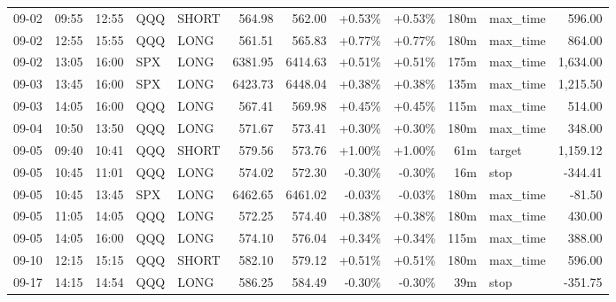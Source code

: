 \documentclass[11pt,a4paper,twoside]{article}
\begin{document}
\begin{center}
\begin{longtable}{>{\color{txtmain}}l l l l l r r r r r >{\color{txtmain}}l r}
09-02 & 09:55 & 12:55 & QQQ & SHORT & 564.98 & 562.00 & \textcolor{wingreen}{+0.53\%} & \textcolor{wingreen}{+0.53\%} & 180m & max\_time & \textcolor{wingreen}{596.00} \\
09-02 & 12:55 & 15:55 & QQQ & LONG & 561.51 & 565.83 & \textcolor{wingreen}{+0.77\%} & \textcolor{wingreen}{+0.77\%} & 180m & max\_time & \textcolor{wingreen}{864.00} \\
09-02 & 13:05 & 16:00 & SPX & LONG & 6381.95 & 6414.63 & \textcolor{wingreen}{+0.51\%} & \textcolor{wingreen}{+0.51\%} & 175m & max\_time & \textcolor{wingreen}{1,634.00} \\
09-03 & 13:45 & 16:00 & SPX & LONG & 6423.73 & 6448.04 & \textcolor{wingreen}{+0.38\%} & \textcolor{wingreen}{+0.38\%} & 135m & max\_time & \textcolor{wingreen}{1,215.50} \\
09-03 & 14:05 & 16:00 & QQQ & LONG & 567.41 & 569.98 & \textcolor{wingreen}{+0.45\%} & \textcolor{wingreen}{+0.45\%} & 115m & max\_time & \textcolor{wingreen}{514.00} \\
09-04 & 10:50 & 13:50 & QQQ & LONG & 571.67 & 573.41 & \textcolor{wingreen}{+0.30\%} & \textcolor{wingreen}{+0.30\%} & 180m & max\_time & \textcolor{wingreen}{348.00} \\
09-05 & 09:40 & 10:41 & QQQ & SHORT & 579.56 & 573.76 & \textcolor{wingreen}{+1.00\%} & \textcolor{wingreen}{+1.00\%} & 61m & target & \textcolor{wingreen}{1,159.12} \\
09-05 & 10:45 & 11:01 & QQQ & LONG & 574.02 & 572.30 & \textcolor{lossred}{-0.30\%} & \textcolor{lossred}{-0.30\%} & 16m & stop & \textcolor{lossred}{-344.41} \\
09-05 & 10:45 & 13:45 & SPX & LONG & 6462.65 & 6461.02 & \textcolor{lossred}{-0.03\%} & \textcolor{lossred}{-0.03\%} & 180m & max\_time & \textcolor{lossred}{-81.50} \\
09-05 & 11:05 & 14:05 & QQQ & LONG & 572.25 & 574.40 & \textcolor{wingreen}{+0.38\%} & \textcolor{wingreen}{+0.38\%} & 180m & max\_time & \textcolor{wingreen}{430.00} \\
09-05 & 14:05 & 16:00 & QQQ & LONG & 574.10 & 576.04 & \textcolor{wingreen}{+0.34\%} & \textcolor{wingreen}{+0.34\%} & 115m & max\_time & \textcolor{wingreen}{388.00} \\
09-10 & 12:15 & 15:15 & QQQ & SHORT & 582.10 & 579.12 & \textcolor{wingreen}{+0.51\%} & \textcolor{wingreen}{+0.51\%} & 180m & max\_time & \textcolor{wingreen}{596.00} \\
09-17 & 14:15 & 14:54 & QQQ & LONG & 586.25 & 584.49 & \textcolor{lossred}{-0.30\%} & \textcolor{lossred}{-0.30\%} & 39m & stop & \textcolor{lossred}{-351.75} \\

\end{longtable}
\end{center}
\end{document}
